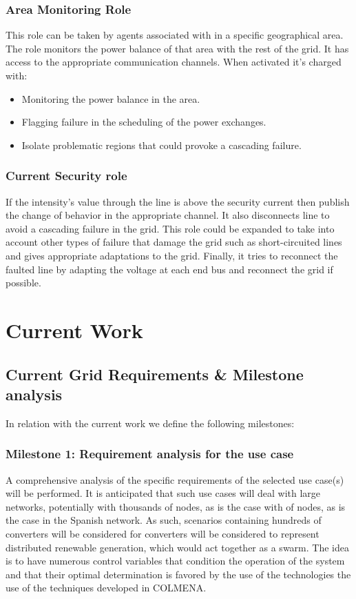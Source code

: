 \documentclass{article}
\begin{document}
\subsubsection*{Area Monitoring Role}

This role can be taken by agents associated with in a specific geographical area. The role monitors the power balance of that area with the rest of the grid. It has access to the appropriate communication channels. When activated it's charged with:
\begin{itemize}
    \item Monitoring the power balance in the area. 
    \item Flagging failure in the scheduling of the power exchanges.
    \item Isolate problematic regions that could provoke a cascading failure.
\end{itemize}

\subsubsection*{Current Security role}
If the intensity's value through the line is above the security current then publish the change of behavior in the appropriate channel. It also disconnects line to avoid a cascading failure in the grid. This role could be expanded to take into account other types of failure that damage the grid such as short-circuited lines and gives appropriate adaptations to the grid. Finally, it tries to reconnect the faulted line by adapting the voltage at each end bus and reconnect the grid if possible.


\section{Current Work}

\subsection{Current Grid Requirements \& Milestone analysis}

In relation with the current work we define the following milestones:

\subsubsection*{Milestone 1: Requirement analysis for the use case}

A comprehensive analysis of the specific requirements of the selected use case(s) will be performed. It is anticipated that such use cases will deal with large networks, potentially with thousands of nodes, as is the case with of nodes, as is the case in the Spanish network. As such, scenarios containing hundreds of converters will be considered for converters will be considered to represent distributed renewable generation, which would act together as a swarm. The idea is to have numerous control variables that condition the operation of the system and that their optimal determination is favored by the use of the technologies the use of the techniques developed in COLMENA.
\end{document}
